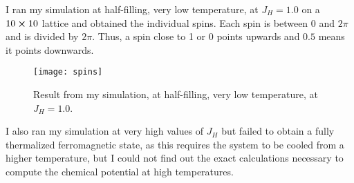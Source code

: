 \documentclass[]{article}
\begin{document}
\newpage
I ran my simulation at half-filling, very low temperature, at $ J_H = 1.0 $ on a $ 10 \cross 10 $ lattice and obtained the individual spins. Each spin is between $ 0 $ and $ 2 \pi $ and is divided by $ 2\pi $. Thus, a spin close to 1 or 0 points upwards and $ 0.5 $ means it points downwards.
\begin{figure}[h!]
	\centering
	\texttt{[image: spins]}
	\caption{Result from my simulation, at half-filling, very low temperature, at $ J_H = 1.0 $.}
	\label{fig:spins}
\end{figure}

I also ran my simulation at very high values of $ J_H $ but failed to obtain a fully thermalized ferromagnetic state, as this requires the system to be cooled from a higher temperature, but I could not find out the exact calculations necessary to compute the chemical potential at high temperatures.

\newpage
\nocite{*}
{}

\end{document}

